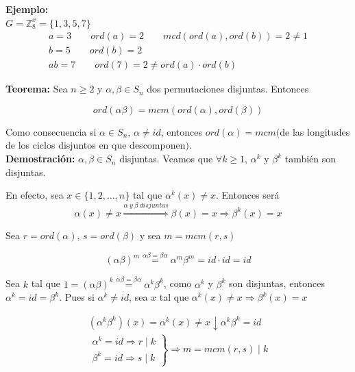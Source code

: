 \documentclass{article}
\begin{document}
\textbf{Ejemplo:} \\

$G=\mathbb{Z}_8^x =\{1,3,5,7\}$
\begin{gather*}
a=3 \qquad ord(a)=2 \qquad mcd(ord(a),ord(b))=2\neq 1 \\
b=5 \qquad ord(b)=2 \\
ab=7 \qquad ord(7)=2\neq ord(a)\cdot ord(b)
\end{gather*}

\textbf{Teorema:} Sea $n\geq 2$ y $\alpha,\beta \in S_n$ dos permutaciones disjuntas. Entonces

\begin{equation*}
ord(\alpha\beta)=mcm(ord(\alpha),ord(\beta))
\end{equation*}

Como consecuencia si $\alpha \in S_n$, $\alpha \neq id$, entonces $ord(\alpha)=mcm($de las longitudes de los ciclos disjuntos en que descomponen$)$. \\

\textbf{Demostración:} $\alpha,\beta \in S_n$ disjuntas. Veamos que $\forall k \geq 1$, $\alpha^k$ y $\beta^k$ también son disjuntas. 

En efecto, sea $x\in \{1,2,\ldots,n\}$ tal que $\alpha^k(x)\neq x$. Entonces será 
\begin{equation*}
\alpha(x)\neq x\overset{\alpha \:y\:\beta\:disjuntas}{\Rightarrow} \beta(x)=x\Rightarrow \beta^k(x)=x
\end{equation*}

Sea $r=ord(\alpha)$, $s=ord(\beta)$ y sea $m=mcm(r,s)$

\begin{equation*}
(\alpha\beta)^m\overset{\alpha\beta=\beta\alpha}{=}\alpha^m\beta^m=id\cdot id=id 
\end{equation*}

Sea $k$ tal que $1=(\alpha\beta)^k\overset{\alpha\beta=\beta\alpha}{=}\alpha^k\beta^k$, como $\alpha^k$ y $\beta^k$ son disjuntas, entonces $\alpha^k=id=\beta^k$. Pues si $\alpha^k\neq id$, sea $x$ tal que $\alpha^k(x)\neq x \Rightarrow \beta^k(x)=x$

\begin{gather*}
(\alpha^k\beta^k)(x)=\alpha^k(x)\neq x \downarrow \alpha^k\beta^k=id \\
\left. \begin{array}{c}
\alpha^k=id\Rightarrow r\mid k \\
\beta^k=id\Rightarrow s\mid k
\end{array} \right\rbrace \Rightarrow m=mcm(r,s)\mid k
\end{gather*}
\end{document}
